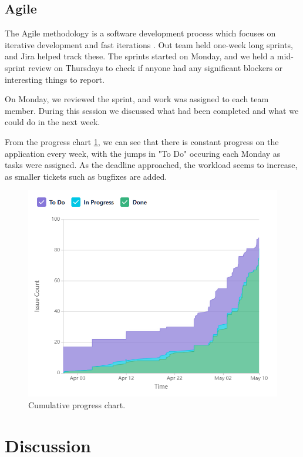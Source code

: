 \documentclass[conference]{IEEEtran}
\begin{document}
\subsection{Agile}
The Agile methodology is a software development process which focuses on iterative development and fast iterations \cite{b2}. Out team held one-week long sprints, and Jira helped track these. The sprints started on Monday, and we held a mid-sprint review on Thursdays to check if anyone had any significant blockers or interesting things to report.

On Monday, we reviewed the sprint, and work was assigned to each team member. During this session we discussed what had been completed and what we could do in the next week. 

From the progress chart \ref{progress}, we can see that there is constant progress on the application every week, with the jumps in "To Do" occuring each Monday as tasks were assigned. As the deadline approached, the workload seems to increase, as smaller tickets such as bugfixes are added.

\begin{figure}[htbp]
\centerline{\includegraphics[width = \linewidth]{cumulative-flow-diagram.png}}
\caption{Cumulative progress chart.}
\label{progress}
\end{figure}

\section{Discussion}
\end{document}
